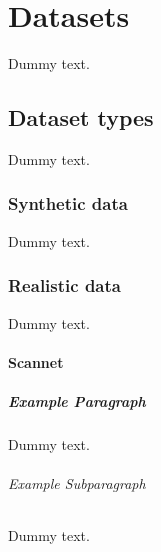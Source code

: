 \chapter{Datasets}

Dummy text.

\section{Dataset types}

Dummy text.

\subsection{Synthetic data}

Dummy text.

\subsection{Realistic data}

Dummy text.

\subsubsection{Scannet}




\paragraph{Example Paragraph}

Dummy text.

\subparagraph{Example Subparagraph}

Dummy text.
